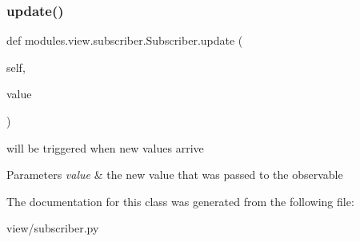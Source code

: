 \subsubsection{\texorpdfstring{update()}{update()}}
{\footnotesize\ttfamily def modules.\+view.\+subscriber.\+Subscriber.\+update (\begin{DoxyParamCaption}\item[{}]{self,  }\item[{}]{value }\end{DoxyParamCaption})}



will be triggered when new values arrive 


\begin{DoxyParams}{Parameters}
{\em value} & the new value that was passed to the observable \\
\hline
\end{DoxyParams}


The documentation for this class was generated from the following file\+:\begin{DoxyCompactItemize}
\item 
view/subscriber.\+py\end{DoxyCompactItemize}
